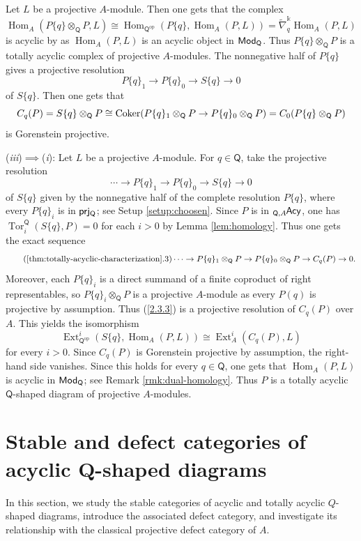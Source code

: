 \documentclass{amsart}
\theoremstyle{bfupright head,slanted body}
\theoremstyle{bfupright head,upright body}
\theoremstyle{fixed bf head,slanted body}
\theoremstyle{fixed bf head,upright body}
\theoremstyle{numbered paragraph}
\newcounter{eqc}
\newenvironment{prf*}[1][Proof]{%
	\begin{proof}[\bf #1]
		\setcounter{equation}{0}
		\renewcommand{\theequation}{\arabic{equation}}}
	{\end{proof}
}
\newcommand{\eqclbl}[1]{{\upshape(\textit{#1})}}
\newcommand{\proofofimp}[3][:]{\mbox{\eqclbl{#2}$\!\implies\!$\eqclbl{#3}#1}}
\numberwithin{equation}{res}
\newcommand{\Hom}{\operatorname{Hom}}
\newcommand{\Ext}[4][]{\operatorname{Ext}_{#1}^{#2}(#3,#4)}
\newcommand{\Tor}[4][]{\operatorname{Tor}_{#2}^{#1}(#3,#4)}
\newcommand{\Coker}[1]{\nobreak{\operatorname{Coker}#1}}
\newcommand{\Q}{\mathsf{Q}}
\newcommand{\kk}{\Bbbk}
\newcommand{\lE}[1]{{}_{#1}\mspace{-1mu}{\sf{Acy}}}
\newcommand{\rMod}[1]{{\sf{Mod}}_{#1}}
\begin{document}
\begin{prf*}
Let $L$ be a projective $A$-module. Then one gets that the complex
$$\Hom_A(P\{q\}\otimes_{\Q}P,L)
\cong\Hom_{\Q^{\mathrm{op}}}(P\{q\},\Hom_A(P,L)) =\widetilde{\nabla}_q^{\kk}\Hom_A(P,L)$$
is acyclic by \cite[Lemma 3.12]{HJ26} as $\Hom_A(P,L)$ is an acyclic object in $\rMod{\Q}$. Thus $P\{q\}\otimes_{\Q}P$ is a totally acyclic complex of projective $A$-modules. The nonnegative half of $P\{q\}$ gives a projective resolution
$$P\{q\}_1\to P\{q\}_0\to S\{q\}\to 0$$
of $S\{q\}$. Then one gets that
$$C_q(P)=S\{q\}\otimes_{\Q}P\cong\Coker(P\{q\}_1\otimes_{\Q}P\to
P\{q\}_0\otimes_{\Q}P)=C_0(P\{q\}\otimes_{\Q}P)$$
is Gorenstein projective.

\proofofimp{iii}{i} Let $L$ be a projective $A$-module. For $q\in\Q$, take the projective resolution
$$\cdots\to P\{q\}_1\to P\{q\}_0\to S\{q\}\to 0$$
of $S\{q\}$ given by the nonnegative half of the complete resolution $P\{q\}$, where every $P\{q\}_i$ is in $\sf prj_\Q$; see Setup \ref{setup:choosen}. Since $P$ is in $\lE{\Q,A}$, one has $\Tor[\Q]{i}{S\{q\}}{P}=0$ for each $i>0$ by Lemma \ref{lem:homology}. Thus one gets the exact sequence
\begin{equation}\tag{\ref{thm:totally-acyclic-characterization}.3}\label{2.3.3}
\cdots\to P\{q\}_1\otimes_{\Q}P
\to P\{q\}_0\otimes_{\Q}P
\to C_q(P)\to 0.
\end{equation}
Moreover, each $P\{q\}_i$ is a direct summand of a finite coproduct of right representables, so $P\{q\}_i\otimes_{\Q}P$ is a projective $A$-module as every $P(q)$ is projective by assumption. Thus (\ref{2.3.3}) is a projective resolution of $C_q(P)$ over $A$. This yields the isomorphism
$$\Ext[\Q^{\mathrm{op}}]{i}{S\{q\}}{\Hom_A(P,L)}
\cong\Ext[A]{i}{C_q(P)}{L}$$
for every $i>0$. Since $C_q(P)$ is Gorenstein projective by assumption, the right-hand side vanishes. Since this holds for every $q\in\Q$, one gets that $\Hom_A(P,L)$ is acyclic in $\rMod{\Q}$; see Remark \ref{rmk:dual-homology}. Thus $P$ is a totally acyclic $\Q$-shaped diagram of projective $A$-modules.
\end{prf*}

\section{Stable and defect categories of acyclic Q-shaped diagrams}
\label{sec:tac-stable}
\noindent
In this section, we study the stable categories of acyclic and totally acyclic $Q$-shaped diagrams, introduce the associated defect category, and investigate its relationship with the classical projective defect category of $A$.
\end{document}
